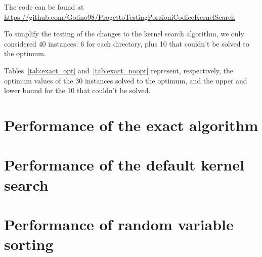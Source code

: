 The code can be found at \url{https://github.com/Golino98/ProgettoTestingPorzioniCodiceKernelSearch}

To simplify the testing of the changes to the kernel search algorithm,
we only considered 40 instances: 6 for each directory,
plus 10 that couldn't be solved to the optimum.

Tables~\ref{tab:exact_opt} and~\ref{tab:exact_noopt} represent,
respectively, the optimum values of the 30 instances solved to
the optimum, and the upper and lower bound for the 10
that couldn't be solved.




\section{Performance of the exact algorithm}


\section{Performance of the default kernel search}


\section{Performance of random variable sorting}
